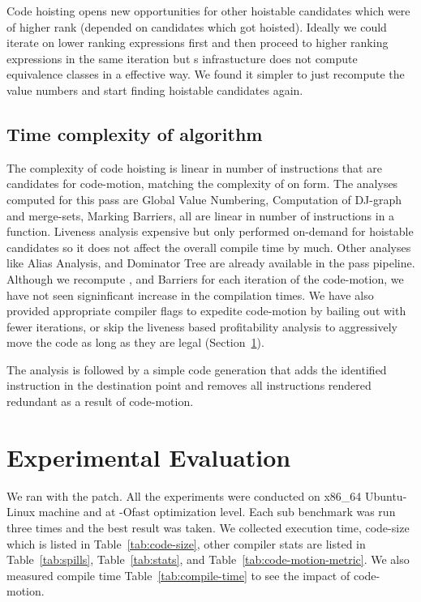 \documentclass[acmlarge,review,anonymous]{acmart}\settopmatter{printfolios=true}
\begin{document}
Code hoisting opens new opportunities for other hoistable candidates which were
of higher rank (depended on candidates which got hoisted). Ideally we could
iterate on lower ranking expressions first and then proceed to higher ranking
expressions in the same iteration but s \GVN{} infrastucture does not
compute equivalence classes in a effective way. We found it simpler to just
recompute the value numbers and start finding hoistable candidates again.

\subsection{Time complexity of algorithm}
The complexity of code hoisting is linear in number of instructions that are
candidates for code-motion, matching the complexity of \PRE{} on \SSA{} form.
The analyses computed for this pass are Global Value Numbering, Computation of
DJ-graph and merge-sets, Marking Barriers, all are linear in number of
instructions in a function. Liveness analysis expensive but only performed
on-demand for hoistable candidates so it does not affect the overall compile
time by much. Other analyses like Alias Analysis, \MemorySSA{} and Dominator Tree
are already available in the \LLVM{} pass pipeline. Although we recompute \GVN{}, and
Barriers for each iteration of the code-motion, we have not seen signinficant
increase in the compilation times. We have also provided appropriate compiler
flags to expedite code-motion by bailing out with fewer iterations, or skip the
liveness based profitability analysis to aggressively move the code as long as
they are legal (Section~\ref{sec:experimental-results}).

The analysis is followed by a simple code generation that adds the identified
instruction in the destination point and removes all instructions rendered
redundant as a result of code-motion.


\section{Experimental Evaluation}
\label{sec:experimental-results}
We ran \SPEC{} with the patch. All the experiments were conducted on x86\_64
Ubuntu-Linux machine and at -Ofast optimization level. Each sub benchmark was
run three times and the best result was taken. We collected execution time,
code-size which is listed in Table~\ref{tab:code-size}, other compiler stats are
listed in Table~\ref{tab:spills}, Table~\ref{tab:stats}, and
Table~\ref{tab:code-motion-metric}.  We also measured compile time
Table~\ref{tab:compile-time} to see the impact of code-motion.
\end{document}
